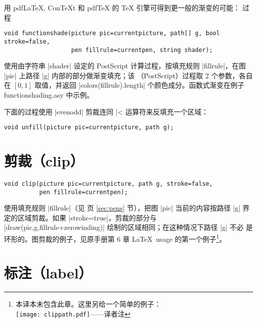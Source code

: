 \documentclass{ctexbook}
\newcommand*\ConTeXt{Con\TeX{}t}
\newcommand*\prgname[1]{\textsf{#1}}
\newcommand\transnote[1]{\footnote{#1——译者注}}
\begin{document}
用 pdf\LaTeX, \ConTeXt{} 和 pdf\TeX{} 的 \TeX{} 引擎可得到更一般的渐变的可能：
过程
\begin{lstlisting}
void functionshade(picture pic=currentpicture, path[] g, bool stroke=false,
                   pen fillrule=currentpen, string shader);
\end{lstlisting}
使用由字符串 |shader| 设定的 \prgname{PostScript} 计算过程，按填充规则
|fillrule|，在图 |pic| 上路径 |g| 内部的部分做渐变填充；该
（\prgname{PostScript}）过程取 2 个参数，各自在 $[0,1]$ 取值，并返回
|colors(fillrule).length| 个颜色成分。函数式渐变在例子
\prgname{functionshading.asy} 中示例。

下面的过程使用 |evenodd| 剪裁连同 |^^| 运算符来反填充一个区域：
\begin{lstlisting}
void unfill(picture pic=currentpicture, path g);
\end{lstlisting}


\section{剪裁（clip）}

\begin{lstlisting}
void clip(picture pic=currentpicture, path g, stroke=false,
          pen fillrule=currentpen);
\end{lstlisting}
使用填充规则 |fillrule|（见 \pageref{sec:pens} 页 \ref{sec:pens} 节），把图
|pic| 当前的内容按路径 |g| 界定的区域剪裁。如果 |stroke=true|，剪裁的部分与
|draw(pic,g,fillrule+zerowinding)| 绘制的区域相同；在这种情况下路径 |g| 不必
是环形的。图剪裁的例子，见原手册第 6 章 \LaTeX\ usage 的第一个例子\transnote{
本译本未包含此章。这里另给一个简单的例子：\\
\vbox{}%
\texttt{[image: clippath.pdf]}\box0}。


\section{标注（label）}
\label{sec:label}
\end{document}
